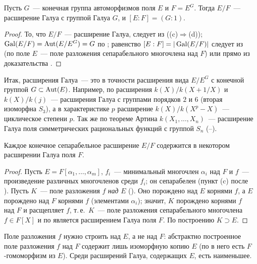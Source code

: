 \begin{corollary}
Пусть $G$~--- конечная группа автоморфизмов поля $E$ и $F=E^G$. Тогда $E/F$~--- расширение Галуа с группой Галуа $G$, и
$[E:F]=(G:1)$.
\end{corollary}

\begin{proof}
То, что $E/F$~--- расширение Галуа, следует из  ((c)$\Rightarrow$(d)); $\operatorname{Gal}(E/F)=\operatorname{Aut}(E/E^G)=G$ по ; равенство
$[E:F]=|\operatorname{Gal}(E/F)|$ следует из  (по  поле $E$~--- поле разложения сепарабельного многочлена над $F$) или
прямо из доказательства .
\end{proof}

Итак, расширения Галуа~--- это в точности расширения вида $E/E^G$ с конечной группой $G\subset\operatorname{Aut}(E)$. Например, по
 расширения $k(X)/k(X+1/X)$ и $k(X)/k(j)$~--- расширения Галуа с группами порядков $2$ и $6$ (вторая изоморфна
$S_3$), а в характеристике $p$ расширение $k(X)/k(X^p-X)$~--- циклическое степени $p$. Так же по теореме Артина
$k(X_1,\dots,X_n)$~--- расширение Галуа поля симметрических рациональных функций с группой $S_n$ (--).

\begin{corollary}[3.12]
Каждое конечное сепарабельное расширение $E/F$ содержится в некотором расширении Галуа поля $F$.
\end{corollary}

\begin{proof}
Пусть $E=F[\alpha_1,\dots,\alpha_m]$, $f_i$~--- минимальный многочлен $\alpha_i$ над $F$ и $f$~--- произведение различных
многочленов среди $f_i$; он сепарабелен (пункт (c) после ). Пусть $K$~--- поле разложения $f$ \emph{над $E$}
(). Оно порождено над $E$ корнями $f$, а $E$ порождено над $F$ корнями $f$ (элементами $\alpha_i$); значит, $K$
порождено корнями $f$ над $F$ и расщепляет $f$, т.\,е.\ $K$~--- поле разложения сепарабельного многочлена $f\in F[X]$ и по
 является расширением Галуа поля $F$. По построению $K\supset E$.
\end{proof}

Поле разложения $f$ нужно строить над $E$, а не над $F$: абстрактно построенное поле разложения $f$ над $F$ содержит лишь
изоморфную копию $E$ (по  в него есть $F$-гомоморфизм из $E$). Среди расширений Галуа, содержащих $E$, есть
наименьшее.


